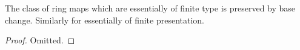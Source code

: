 \begin{lemma}
\label{lemma-base-change-essentially-of-finite-type}
The class of ring maps which are essentially of finite type is
preserved by base change. Similarly for essentially of finite
presentation.
\end{lemma}

\begin{proof}
Omitted.
\end{proof}